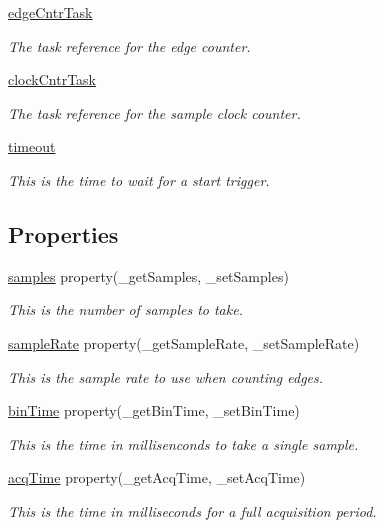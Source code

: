 \begin{DoxyCompactItemize}
\hyperlink{class_chassis_8git_1_1p_counter_1_1p_counter_aa9f5bba0fb4280d94d7e800a02f0b941}{edge\-Cntr\-Task}
\begin{DoxyCompactList}\small\item\em The task reference for the edge counter. \end{DoxyCompactList}\item 
\hyperlink{class_chassis_8git_1_1p_counter_1_1p_counter_a24e9aefcb3db02d776ddf8f3a0a532c9}{clock\-Cntr\-Task}
\begin{DoxyCompactList}\small\item\em The task reference for the sample clock counter. \end{DoxyCompactList}\item 
\hyperlink{class_chassis_8git_1_1p_counter_1_1p_counter_ac2ada7a331b6be8cbd540485f0d90edd}{timeout}
\begin{DoxyCompactList}\small\item\em This is the time to wait for a start trigger. \end{DoxyCompactList}\end{DoxyCompactItemize}
\subsection*{Properties}
\begin{DoxyCompactItemize}
\item 
\hyperlink{class_chassis_8git_1_1p_counter_1_1p_counter_acfa466a92fa7a706ba68493e1ff59441}{samples} property(\-\_\-get\-Samples, \-\_\-set\-Samples)
\begin{DoxyCompactList}\small\item\em This is the number of samples to take. \end{DoxyCompactList}\item 
\hyperlink{class_chassis_8git_1_1p_counter_1_1p_counter_a29044984e50fe6405e37cf63880c0bf6}{sample\-Rate} property(\-\_\-get\-Sample\-Rate, \-\_\-set\-Sample\-Rate)
\begin{DoxyCompactList}\small\item\em This is the sample rate to use when counting edges. \end{DoxyCompactList}\item 
\hyperlink{class_chassis_8git_1_1p_counter_1_1p_counter_a490e12592d8045195f68cc17bcc8fcf4}{bin\-Time} property(\-\_\-get\-Bin\-Time, \-\_\-set\-Bin\-Time)
\begin{DoxyCompactList}\small\item\em This is the time in millisenconds to take a single sample. \end{DoxyCompactList}\item 
\hyperlink{class_chassis_8git_1_1p_counter_1_1p_counter_a052d0809530db74794149e44570812d9}{acq\-Time} property(\-\_\-get\-Acq\-Time, \-\_\-set\-Acq\-Time)
\begin{DoxyCompactList}\small\item\em This is the time in milliseconds for a full acquisition period. \end{DoxyCompactList}\end{DoxyCompactItemize}


